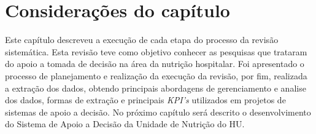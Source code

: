 \section{Considerações do capítulo}
Este capítulo descreveu a execução de cada etapa do processo da revisão sistemática. Esta revisão teve como objetivo conhecer as pesquisas que trataram do apoio a tomada de decisão na área da nutrição hospitalar. Foi apresentado o processo de planejamento e realização da execução da revisão, por fim, realizada a extração dos dados, obtendo principais abordagens de gerenciamento e analise dos dados, formas de extração e principais \textit{KPI's} utilizados em projetos de sistemas de apoio a decisão. No próximo capítulo será descrito o desenvolvimento do Sistema de Apoio a Decisão da Unidade de Nutrição do HU.